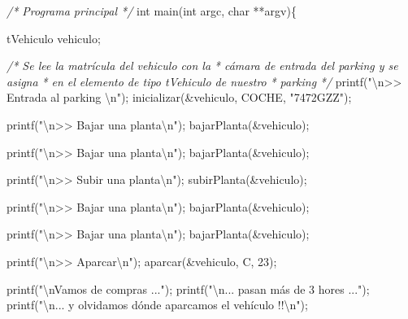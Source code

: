 \documentclass[
]{book}
\newenvironment{Shaded}{\begin{snugshade}}{\end{snugshade}}
\newcommand{\CharTok}[1]{\textcolor[rgb]{0.31,0.60,0.02}{#1}}
\newcommand{\CommentTok}[1]{\textcolor[rgb]{0.56,0.35,0.01}{\textit{#1}}}
\newcommand{\DataTypeTok}[1]{\textcolor[rgb]{0.13,0.29,0.53}{#1}}
\newcommand{\DecValTok}[1]{\textcolor[rgb]{0.00,0.00,0.81}{#1}}
\newcommand{\NormalTok}[1]{#1}
\newcommand{\SpecialCharTok}[1]{\textcolor[rgb]{0.00,0.00,0.00}{#1}}
\newcommand{\StringTok}[1]{\textcolor[rgb]{0.31,0.60,0.02}{#1}}
\begin{document}
\begin{Shaded}
\begin{Highlighting}[]
\CommentTok{/* Programa principal */}
\DataTypeTok{int}\NormalTok{ main(}\DataTypeTok{int}\NormalTok{ argc, }\DataTypeTok{char}\NormalTok{ **argv)\{}
    
\NormalTok{    tVehiculo vehiculo;}
    
    \CommentTok{/* Se lee la matrícula del vehiculo con la}
\CommentTok{     * cámara de entrada del parking y se asigna}
\CommentTok{     * en el elemento de tipo tVehiculo de nuestro}
\CommentTok{     * parking}
\CommentTok{     */}
\NormalTok{    printf(}\StringTok{"}\SpecialCharTok{\textbackslash{}n}\StringTok{\textgreater{}\textgreater{} Entrada al parking }\SpecialCharTok{\textbackslash{}n}\StringTok{"}\NormalTok{);}
\NormalTok{    inicializar(\&vehiculo, COCHE, }\StringTok{"7472GZZ"}\NormalTok{);}
    
\NormalTok{    printf(}\StringTok{"}\SpecialCharTok{\textbackslash{}n}\StringTok{\textgreater{}\textgreater{} Bajar una planta}\SpecialCharTok{\textbackslash{}n}\StringTok{"}\NormalTok{);}
\NormalTok{    bajarPlanta(\&vehiculo);}
    
\NormalTok{    printf(}\StringTok{"}\SpecialCharTok{\textbackslash{}n}\StringTok{\textgreater{}\textgreater{} Bajar una planta}\SpecialCharTok{\textbackslash{}n}\StringTok{"}\NormalTok{);}
\NormalTok{    bajarPlanta(\&vehiculo);}
    
\NormalTok{    printf(}\StringTok{"}\SpecialCharTok{\textbackslash{}n}\StringTok{\textgreater{}\textgreater{} Subir una planta}\SpecialCharTok{\textbackslash{}n}\StringTok{"}\NormalTok{);}
\NormalTok{    subirPlanta(\&vehiculo);}
    
\NormalTok{    printf(}\StringTok{"}\SpecialCharTok{\textbackslash{}n}\StringTok{\textgreater{}\textgreater{} Bajar una planta}\SpecialCharTok{\textbackslash{}n}\StringTok{"}\NormalTok{);}
\NormalTok{    bajarPlanta(\&vehiculo);}
    
\NormalTok{    printf(}\StringTok{"}\SpecialCharTok{\textbackslash{}n}\StringTok{\textgreater{}\textgreater{} Bajar una planta}\SpecialCharTok{\textbackslash{}n}\StringTok{"}\NormalTok{);}
\NormalTok{    bajarPlanta(\&vehiculo);}
    
\NormalTok{    printf(}\StringTok{"}\SpecialCharTok{\textbackslash{}n}\StringTok{\textgreater{}\textgreater{} Aparcar}\SpecialCharTok{\textbackslash{}n}\StringTok{"}\NormalTok{);}
\NormalTok{    aparcar(\&vehiculo, }\CharTok{\textquotesingle{}C\textquotesingle{}}\NormalTok{, }\DecValTok{23}\NormalTok{);}
    
\NormalTok{    printf(}\StringTok{"}\SpecialCharTok{\textbackslash{}n}\StringTok{Vamos de compras ..."}\NormalTok{);}
\NormalTok{    printf(}\StringTok{"}\SpecialCharTok{\textbackslash{}n}\StringTok{... pasan más de 3 hores ..."}\NormalTok{);}
\NormalTok{    printf(}\StringTok{"}\SpecialCharTok{\textbackslash{}n}\StringTok{... y olvidamos dónde aparcamos el vehículo !!}\SpecialCharTok{\textbackslash{}n}\StringTok{"}\NormalTok{);}
    

\end{Highlighting}
\end{Shaded}
\end{document}
